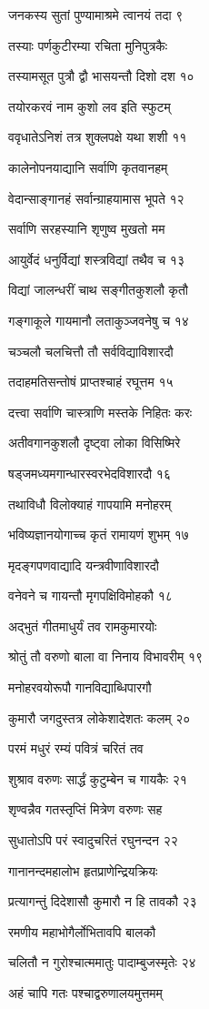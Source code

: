 जनकस्य सुतां पुण्यामाश्रमे त्वानयं तदा ९

तस्याः पर्णकुटीरम्या रचिता मुनिपुत्रकैः

तस्यामसूत पुत्रौ द्वौ भासयन्तौ दिशो दश १०

तयोरकरवं नाम कुशो लव इति स्फुटम्

ववृधातेऽनिशं तत्र शुक्लपक्षे यथा शशी ११

कालेनोपनयाद्यानि सर्वाणि कृतवानहम्

वेदान्साङ्गानहं सर्वान्ग्राहयामास भूपते १२

सर्वाणि सरहस्यानि शृणुष्व मुखतो मम

आयुर्वेदं धनुर्विद्यां शस्त्रविद्यां तथैव च १३

विद्यां जालन्धरीं चाथ सङ्गीतकुशलौ कृतौ

गङ्गाकूले गायमानौ लताकुञ्जवनेषु च १४

चञ्चलौ चलचित्तौ तौ सर्वविद्याविशारदौ

तदाहमतिसन्तोषं प्राप्तश्चाहं रघूत्तम १५

दत्त्वा सर्वाणि चास्त्राणि मस्तके निहितः करः

अतीवगानकुशलौ दृष्ट्वा लोका विसिष्मिरे

षड्जमध्यमगान्धारस्वरभेदविशारदौ १६

तथाविधौ विलोक्याहं गापयामि मनोहरम्

भविष्यज्ञानयोगाच्च कृतं रामायणं शुभम् १७

मृदङ्गपणवाद्यादि यन्त्रवीणाविशारदौ

वनेवने च गायन्तौ मृगपक्षिविमोहकौ १८

अद्भुतं गीतमाधुर्यं तव रामकुमारयोः

श्रोतुं तौ वरुणो बाला वा निनाय विभावरीम् १९

मनोहरवयोरूपौ गानविद्याब्धिपारगौ

कुमारौ जगदुस्तत्र लोकेशादेशतः कलम् २०

परमं मधुरं रम्यं पवित्रं चरितं तव

शुश्राव वरुणः सार्द्धं कुटुम्बेन च गायकैः २१

शृण्वन्नैव गतस्तृप्तिं मित्रेण वरुणः सह

सुधातोऽपि परं स्वादुचरितं रघुनन्दन २२

गानानन्दमहालोभ हृतप्राणेन्द्रियक्रियः

प्रत्यागन्तुं दिदेशासौ कुमारौ न हि तावकौ २३

रमणीय महाभोगैर्लोभितावपि बालकौ

चलितौ न गुरोश्चात्ममातुः पादाम्बुजस्मृतेः २४

अहं चापि गतः पश्चाद्वरुणालयमुत्तमम्

